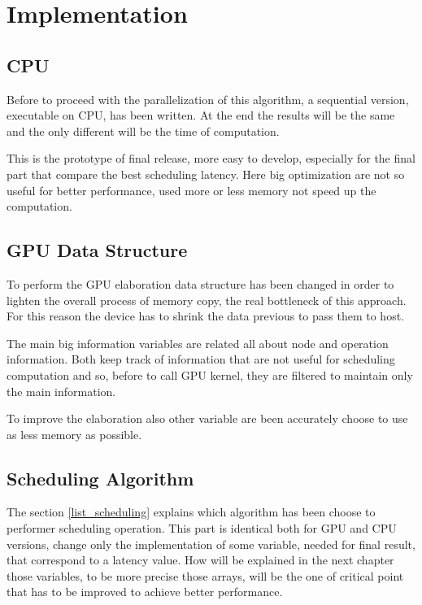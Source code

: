 \chapter{Implementation}
\label{chap3}

\section{CPU}

Before to proceed with the parallelization of this algorithm, a sequential version, executable on CPU, has been written. At the end the results will be the same and the only different will be the time of computation.

This is the prototype of final release, more easy to develop, especially for the final part that compare the best scheduling latency. Here big optimization are not so useful for better performance, used more or less memory not speed up the computation.

\section{GPU Data Structure}

To perform the GPU elaboration data structure has been changed in order to lighten the overall process of memory copy, the real bottleneck of this approach. For this reason the device has to shrink the data previous to pass them to host.

The main big information variables are related all about node and operation information. Both keep track of information that are not useful for scheduling computation and so, before to call GPU kernel, they are filtered to maintain only the main information.

To improve the elaboration also other variable are been accurately choose to use as less memory as possible.

\section{Scheduling Algorithm}

The section \ref{list_scheduling} explains which algorithm has been choose to performer scheduling operation. This part is identical both for GPU and CPU versions, change only the implementation of some variable, needed for final result, that correspond to a latency value. How will be explained in the next chapter those variables, to be more precise those arrays, will be the one of critical point that has to be improved to achieve better performance.


